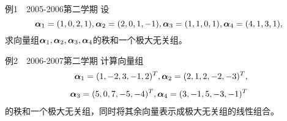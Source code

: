 


\begin{frame}\ft{\subsecname}
  \begin{footnotesize}
    \begin{exampleblock}{例1~~2005-2006第二学期}
      设$$\boldsymbol{\alpha}_1=(1,0,2,1),\boldsymbol{\alpha}_2=(2,0,1,-1),\boldsymbol{\alpha}_3=(1,1,0,1),\boldsymbol{\alpha}_4=(4,1,3,1),$$
      求向量组$\boldsymbol{\alpha}_1,\boldsymbol{\alpha}_2,\boldsymbol{\alpha}_3,\boldsymbol{\alpha}_4$的秩和一个极大无关组。
    \end{exampleblock}


    \begin{exampleblock}{例2~~2006-2007第二学期}
      计算向量组$$
      \begin{aligned}
      \boldsymbol{\alpha}_1=(1,-2,3,-1,2)^T,\boldsymbol{\alpha}_2=(2,1,2,-2,-3)^T, \\[1ex]
      \boldsymbol{\alpha}_3=(5,0,7,-5,-4)^T,\boldsymbol{\alpha}_4=(3,-1,5,-3,-1)^T
      \end{aligned}$$
      的秩和一个极大无关组，同时将其余向量表示成极大无关组的线性组合。
    \end{exampleblock}
  \end{footnotesize}
\end{frame}






